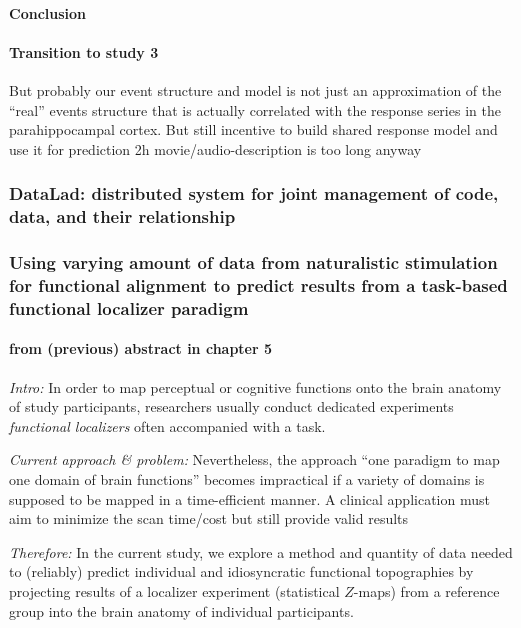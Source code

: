 \paragraph{Conclusion}


\paragraph{Transition to study 3}

%
But probably our event structure and model is not just an approximation of the
``real'' events structure that is actually correlated with the response series
in the parahippocampal cortex.
%
But still incentive to build shared response model and use it for prediction
%
2h movie/audio-description is too long anyway


\subsubsection{DataLad: distributed system for joint management of code, data,
and their relationship}



\subsubsection{Using varying amount of data from naturalistic stimulation for
functional alignment to predict results from a task-based functional localizer
paradigm}

\paragraph{from (previous) abstract in chapter 5}
\textit{Intro:} In order to map perceptual or cognitive functions onto the brain
anatomy of study participants, researchers usually conduct dedicated experiments
\textit{functional localizers} often accompanied with a task.

\textit{Current approach \& problem:} Nevertheless, the approach ``one paradigm
to map one domain of brain functions'' becomes impractical if a variety of
domains is supposed to be mapped in a time-efficient manner.
%
A clinical application must aim to minimize the scan time/cost but still provide
valid results

\textit{Therefore:} In the current study, we explore a method and quantity of
data needed to (reliably) predict individual and idiosyncratic functional
topographies by projecting results of a localizer experiment (statistical
$Z$-maps) from a reference group into the brain anatomy of individual
participants.

